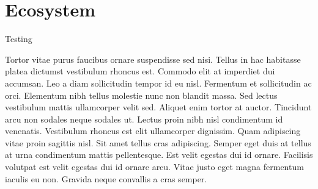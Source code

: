 \section{Ecosystem}

Testing

Tortor vitae purus faucibus ornare suspendisse sed nisi. Tellus in hac habitasse platea dictumst vestibulum rhoncus est. Commodo elit at imperdiet dui accumsan. Leo a diam sollicitudin tempor id eu nisl. Fermentum et sollicitudin ac orci. Elementum nibh tellus molestie nunc non blandit massa. Sed lectus vestibulum mattis ullamcorper velit sed. Aliquet enim tortor at auctor. Tincidunt arcu non sodales neque sodales ut. Lectus proin nibh nisl condimentum id venenatis. Vestibulum rhoncus est  elit ullamcorper dignissim. Quam adipiscing vitae proin sagittis nisl. Sit amet tellus cras adipiscing. Semper eget duis at tellus at urna condimentum mattis pellentesque. Est velit egestas dui id ornare. Facilisis volutpat est velit egestas dui id ornare arcu. Vitae justo eget magna fermentum iaculis eu non. Gravida neque convallis a cras semper.

